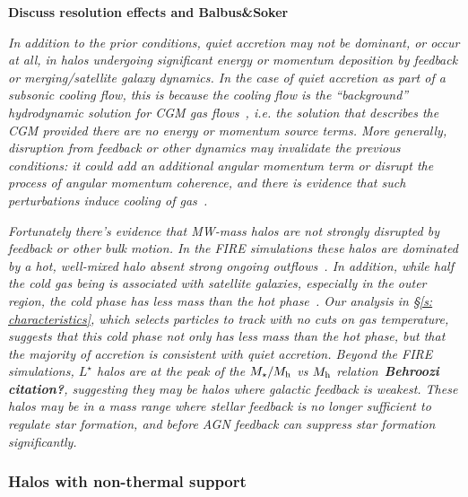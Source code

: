 \documentclass[fleqn,usenatbib]{mnras}
\begin{document}
\textbf{Discuss resolution effects and Balbus\&Soker}

\textit{
In addition to the prior conditions, quiet accretion may not be dominant, or occur at all, in halos undergoing significant energy or momentum deposition by feedback or merging/satellite galaxy dynamics.
In the case of quiet accretion as part of a subsonic cooling flow, this is because the cooling flow is the ``background'' hydrodynamic solution for CGM gas flows~\cite{Stern2019}, i.e. the solution that describes the CGM provided there are no energy or momentum source terms.
More generally, disruption from feedback or other dynamics may invalidate the previous conditions: it could add an additional angular momentum term or disrupt the process of angular momentum coherence, and there is evidence that such perturbations induce cooling of gas~\citep[e.g.][]{Hummels2019, Esmerian2020}.
}

\textit{
Fortunately there's evidence that MW-mass halos are not strongly disrupted by feedback or other bulk motion.
In the FIRE simulations these halos are dominated by a hot, well-mixed halo absent strong ongoing outflows~\citep{Hafen2019}.
In addition, while half the cold gas being is associated with satellite galaxies, especially in the outer region, the cold phase has less mass than the hot phase~\citep{Hafen2020}.
Our analysis in \S\ref{s: characteristics}, which selects particles to track with no cuts on gas temperature, suggests that this cold phase not only has less mass than the hot phase, but that the majority of accretion is consistent with quiet accretion.
Beyond the FIRE simulations, $L^\star$ halos are at the peak of the $M_\star/M_{\rm h}$ vs $M_{\rm h}$ relation~\textbf{Behroozi citation?}, suggesting they may be halos where galactic feedback is weakest.
These halos may be in a mass range where stellar feedback is no longer sufficient to regulate star formation, and before AGN feedback can suppress star formation significantly.
}

\subsubsection{Halos with non-thermal support}
\end{document}
